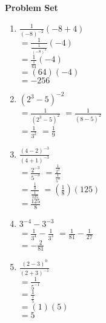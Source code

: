 \textbf{Problem Set}

\vspce


\begin{enumerate}[label = \arabic*. ]

\item \hspce%
$\displaystyle \frac{1}{(-8)^{-2}}(-8+4)$\\
$=\displaystyle \frac{1}{\displaystyle \frac{1}{(-8)^{2}} }(-4)$\\
$=\displaystyle \frac{1}{\displaystyle \frac{1}{64} }(-4)$\\
$=(64)(-4)$\\
$=-256 $

\item \hspce%
$(2^{3} - 5)^{-2}$\\
$=\displaystyle \frac{1}{(2^{3} - 5)^{2}} $
$=\displaystyle \frac{1}{(8 - 5)^{2}} $\\
$=\displaystyle \frac{1}{3^{2}} $
$=\displaystyle\frac{1}{9} $

\item \hspce%
$\displaystyle \frac{(4-2)^{-3}}{(4+1)^{-3}}$\\
$=\displaystyle \frac{2^{-3}}{5^{-3}}$
$=\displaystyle \frac{\displaystyle \frac{1}{2^{3}} }{\displaystyle \frac{1}{5^{3}} }$\\
$=\displaystyle \frac{\displaystyle \frac{1}{8} }{\displaystyle \frac{1}{125} }$
$=\left( \displaystyle \frac{1}{8}\right) (125)$\\
$=\displaystyle\frac{125}{8} $\\

\item \hspce%
$3^{-4}-3^{-3}$\\
$=\displaystyle \frac{1}{3^{4}} -\displaystyle \frac{1}{3^{3}} $%
$=\displaystyle \frac{1}{81} -\displaystyle \frac{1}{27} $\\
$=\displaystyle - \frac{2}{81} $\\

\item \hspce%
$\displaystyle \frac{(2-3)^{0}}{(2+3)^{-1}}$\\
$=\displaystyle \frac{1}{5^{-1}}$\\
$=\displaystyle \frac{1}{\displaystyle \frac{1}{5}} $\\
$=(1)(5)$\\
$=5 $


\end{enumerate}